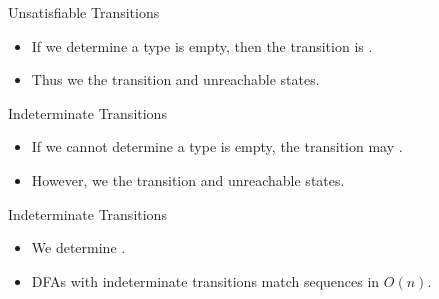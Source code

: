 



\newsavebox\classbox
\begin{lrbox}{\classbox}
  \begin{minipage}{5cm}
    
  \end{minipage}
\end{lrbox}

\begin{frame}{Unsatisfiable Transitions}

  \scalebox{0.8}{}
  \begin{itemize}
  \item   If we determine a type is empty, then the transition is .
  \item Thus we  the transition and unreachable states.

  \end{itemize}
\end{frame}

\begin{frame}{Indeterminate Transitions}

  \scalebox{0.8}{}

  \begin{itemize}
  \item   If we cannot determine a type is empty, the transition may
    . 
  \item  However, we     the transition and unreachable states.
  \end{itemize}
\end{frame}


\begin{frame}{Indeterminate Transitions}

  \scalebox{0.8}{}

  \begin{itemize}
    \item We  determine .
    \item DFAs with indeterminate transitions 
      match sequences in $O(n)$.
  \end{itemize}
\end{frame}


